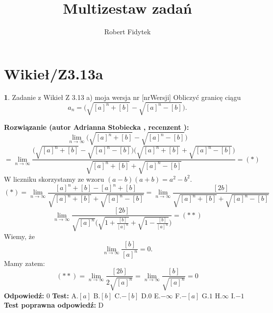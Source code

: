 \documentclass[12pt, a4paper]{article}
\title{Multizestaw zadań}
\author{Robert Fidytek}
\date{}
\theoremstyle{definition} %
\newtheorem{zad}{}
\newcommand{\kategoria}[1]{\section{#1}} %
\newcommand{\zadStart}[1]{\begin{zad}#1\newline} %
\newcommand{\zadStop}{\end{zad}}   %
\newcommand{\rozwStart}[2]{\noindent \textbf{Rozwiązanie (autor #1 , recenzent #2): }\newline} %
\newcommand{\rozwStop}{\newline}                                            %
\newcommand{\odpStart}{\noindent \textbf{Odpowiedź:}\newline}    %
\newcommand{\odpStop}{\newline}                                             %
\newcommand{\testStart}{\noindent \textbf{Test:}\newline} %
\newcommand{\testStop}{\newline} %
\newcommand{\kluczStart}{\noindent \textbf{Test poprawna odpowiedź:}\newline} %
\newcommand{\kluczStop}{\newline} %
\begin{document}
\maketitle


\kategoria{Wikieł/Z3.13a}
\zadStart{Zadanie z Wikieł Z 3.13 a) moja wersja nr [nrWersji]}
Obliczyć granicę ciągu 
$$a_n=\big(\sqrt{[a]^n+[b]}-\sqrt{[a]^n-[b]}\big).$$
\zadStop
\rozwStart{Adrianna Stobiecka}{}
$$\lim_{n\to\infty}\big(\sqrt{[a]^n+[b]}-\sqrt{[a]^n-[b]}\big)$$
$$=\lim_{n\to\infty}\frac{\big(\sqrt{[a]^n+[b]}-\sqrt{[a]^n-[b]}\big)\big(\sqrt{[a]^n+[b]}+\sqrt{[a]^n-[b]}\big)}{\sqrt{[a]^n+[b]}+\sqrt{[a]^n-[b]}}=(*)$$
W liczniku skorzystamy ze wzoru $(a-b)(a+b)=a^2-b^2$.
$$(*)=\lim_{n\to\infty}\frac{[a]^n+[b]-[a]^n+[b]}{\sqrt{[a]^n+[b]}+\sqrt{[a]^n-[b]}}=\lim_{n\to\infty}\frac{[2b]}{\sqrt{[a]^n+[b]}+\sqrt{[a]^n-[b]}}$$
$$\lim_{n\to\infty}\frac{[2b]}{\sqrt{[a]^n}\big(\sqrt{1+\frac{[b]}{[a]^n}}+\sqrt{1-\frac{[b]}{[a]^n}}\big)}=(**)$$
Wiemy, że $$\lim_{n\to\infty}\frac{[b]}{[a]^n}=0.$$
Mamy zatem:
$$(**)=\lim_{n\to\infty}\frac{[2b]}{2\sqrt{[a]^n}}=\lim_{n\to\infty}\frac{[b]}{\sqrt{[a]^n}}=0$$
\rozwStop
\odpStart
$0$
\odpStop
\testStart
A.$[a]$
B.$[b]$
C.$-[b]$
D.$0$
E.$-\infty$
F.$-[a]$
G.$1$
H.$\infty$
I.$-1$
\testStop
\kluczStart
D
\kluczStop
\end{document}
